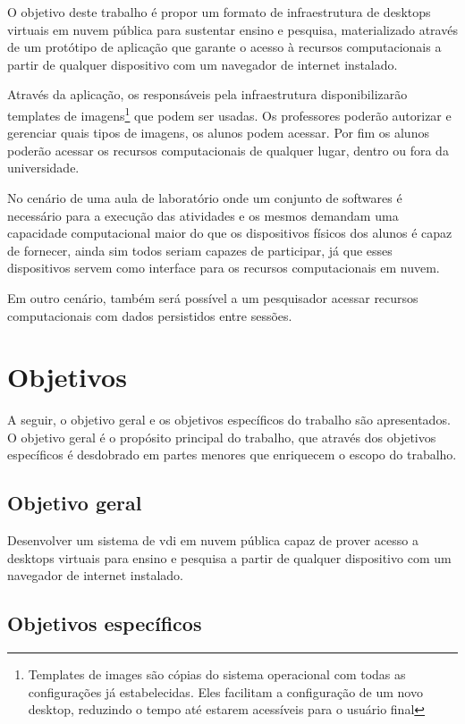 O objetivo deste trabalho é propor um formato de infraestrutura de \glspl{desktop} virtuais em
nuvem pública para sustentar ensino e pesquisa, materializado através de um protótipo de aplicação
que garante o acesso à recursos computacionais a partir de qualquer dispositivo com um navegador de
internet instalado.

Através da aplicação, os responsáveis pela infraestrutura disponibilizarão templates de
imagens\footnote{Templates de images são cópias do sistema operacional com todas as configurações já
estabelecidas. Eles facilitam a configuração de um novo \gls{desktop}, reduzindo o tempo até
estarem acessíveis para o usuário final} que podem ser usadas. Os professores poderão autorizar e
gerenciar quais tipos de imagens, os alunos podem acessar. Por fim os alunos poderão acessar os
recursos computacionais de qualquer lugar, dentro ou fora da universidade.

No cenário de uma aula de laboratório onde um conjunto de softwares é necessário para a execução das
atividades e os mesmos demandam uma capacidade computacional maior do que os dispositivos físicos
dos alunos é capaz de fornecer, ainda sim todos seriam capazes de participar, já que esses
dispositivos servem como interface para os recursos computacionais em nuvem.

Em outro cenário, também será possível a um pesquisador acessar recursos computacionais com dados
persistidos entre sessões. 

\section{Objetivos}
\label{sec:objetivos}

A seguir, o objetivo geral e os objetivos específicos do trabalho são apresentados. O objetivo geral
é o propósito principal do trabalho, que através dos objetivos específicos é desdobrado em partes
menores que enriquecem o escopo do trabalho.

\subsection{Objetivo geral}
\label{subsec:objetivoGeral}

Desenvolver um sistema de \gls{vdi} em nuvem pública capaz de prover acesso a \glspl{desktop}
virtuais para ensino e pesquisa a partir de qualquer dispositivo com um navegador de internet
instalado.

\subsection{Objetivos específicos}
\label{subsec:objetivosEspecificos}

